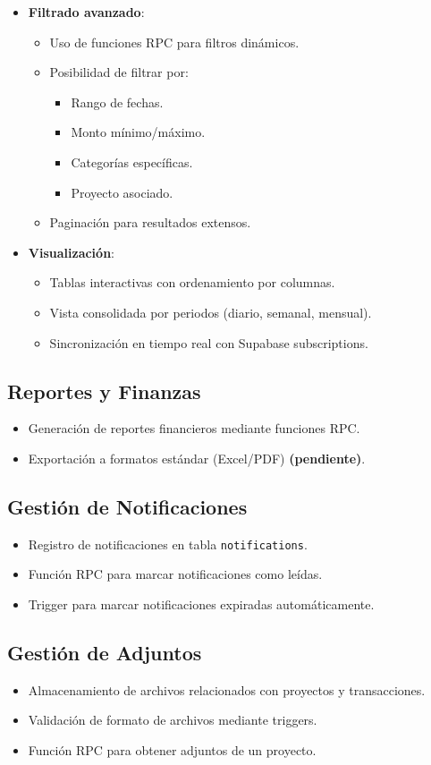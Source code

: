 \begin{itemize}
    \item \textbf{Filtrado avanzado}:
    \begin{itemize}
        \item Uso de funciones RPC para filtros dinámicos.
        \item Posibilidad de filtrar por:
        \begin{itemize}
            \item Rango de fechas.
            \item Monto mínimo/máximo.
            \item Categorías específicas.
            \item Proyecto asociado.
        \end{itemize}
        \item Paginación para resultados extensos.
    \end{itemize}
    
    \item \textbf{Visualización}:
    \begin{itemize}
        \item Tablas interactivas con ordenamiento por columnas.
        \item Vista consolidada por periodos (diario, semanal, mensual).
        \item Sincronización en tiempo real con Supabase subscriptions.
    \end{itemize}
\end{itemize}

\subsection{Reportes y Finanzas}
\begin{itemize}
    \item Generación de reportes financieros mediante funciones RPC.
    \item Exportación a formatos estándar (Excel/PDF) \textbf{(pendiente)}.
\end{itemize}

\subsection{Gestión de Notificaciones}
\begin{itemize}
    \item Registro de notificaciones en tabla \texttt{notifications}.
    \item Función RPC para marcar notificaciones como leídas.
    \item Trigger para marcar notificaciones expiradas automáticamente.
\end{itemize}

\subsection{Gestión de Adjuntos}
\begin{itemize}
    \item Almacenamiento de archivos relacionados con proyectos y transacciones.
    \item Validación de formato de archivos mediante triggers.
    \item Función RPC para obtener adjuntos de un proyecto.
\end{itemize}